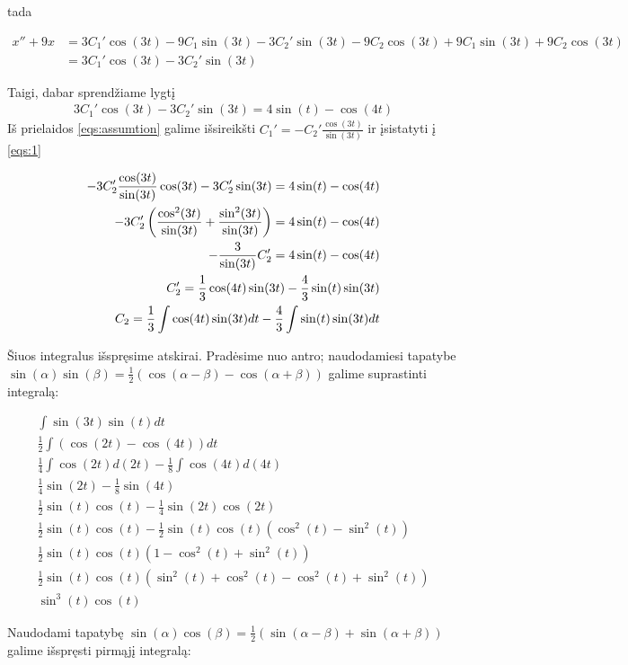 \documentclass[11pt]{article}
\begin{document}
tada

\begin{align*}
x''+9x&=3C_1'\cos(3t)-9C_1\sin(3t)-3C_2'\sin(3t)-9C_2\cos(3t)+9C_1\sin(3t)+9C_2\cos(3t)\\
&=3C_1'\cos(3t)-3C_2'\sin(3t)
\end{align*}

Taigi, dabar sprendžiame lygtį
\begin{align}
3C_1'\cos(3t)-3C_2'\sin(3t)=4\sin(t)-\cos(4t) \label{eqs:1}
\end{align}
Iš prielaidos \eqref{eqs:assumtion} galime išsireikšti $C_1'=-C_2'\frac{\cos(3t)}{\sin(3t)}$ ir įsistatyti į \eqref{eqs:1}

\begin{align}
-3C_2'\frac{\cos(3t)}{\sin(3t)}\cos(3t)-3C_2'\sin(3t)=4\sin(t)-\cos(4t) \notag\\
-3C_2'\left(\frac{\cos^2(3t)}{\sin(3t)}+\frac{\sin^2(3t)}{\sin(3t)}\right)=4\sin(t)-\cos(4t) \notag\\
-\frac{3}{\sin(3t)}C_2'=4\sin(t)-\cos(4t) \notag\\
C_2'=\frac{1}{3}\cos(4t)\sin(3t)-\frac{4}{3}\sin(t)\sin(3t) \label{eqs:c2d}\\
C_2=\frac{1}{3}\int\cos(4t)\sin(3t)dt-\frac{4}{3}\int\sin(t)\sin(3t)dt \label{eqs:c2}
\end{align}

Šiuos integralus išspręsime atskirai. Pradėsime nuo antro; naudodamiesi
tapatybe \\ $\sin(\alpha)\sin(\beta)=\frac{1}{2}(\cos(\alpha-\beta)-\cos(\alpha+\beta))$
galime suprastinti integralą:

\begin{align*}
\int\sin(3t)\sin(t)dt\\
\frac{1}{2}\int(\cos(2t)-\cos(4t))dt\\
\frac{1}{4}\int\cos(2t)d(2t)-\frac{1}{8}\int\cos(4t)d(4t)\\
\frac{1}{4}\sin(2t)-\frac{1}{8}\sin(4t)\\
\frac{1}{2}\sin(t)\cos(t)-\frac{1}{4}\sin(2t)\cos(2t)\\
\frac{1}{2}\sin(t)\cos(t)-\frac{1}{2}\sin(t)\cos(t)(\cos^2(t)-\sin^2(t))\\
\frac{1}{2}\sin(t)\cos(t)(1-\cos^2(t)+\sin^2(t))\\
\frac{1}{2}\sin(t)\cos(t)(\sin^2(t)+\cos^2(t)-\cos^2(t)+\sin^2(t))\\
\sin^3(t)\cos(t)
\end{align*}

Naudodami tapatybę $\sin(\alpha)\cos(\beta)=\frac{1}{2}(\sin(\alpha-\beta)+\sin(\alpha+\beta))$ galime išspręsti pirmąjį integralą:
\end{document}

